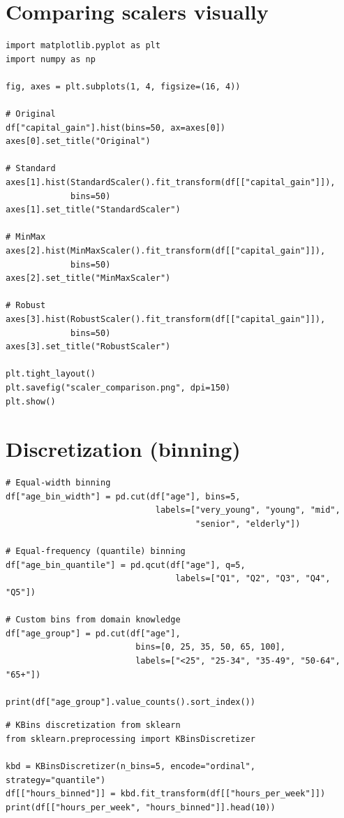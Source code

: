 \section{Comparing scalers visually}

\begin{verbatim}
import matplotlib.pyplot as plt
import numpy as np

fig, axes = plt.subplots(1, 4, figsize=(16, 4))

# Original
df["capital_gain"].hist(bins=50, ax=axes[0])
axes[0].set_title("Original")

# Standard
axes[1].hist(StandardScaler().fit_transform(df[["capital_gain"]]),
             bins=50)
axes[1].set_title("StandardScaler")

# MinMax
axes[2].hist(MinMaxScaler().fit_transform(df[["capital_gain"]]),
             bins=50)
axes[2].set_title("MinMaxScaler")

# Robust
axes[3].hist(RobustScaler().fit_transform(df[["capital_gain"]]),
             bins=50)
axes[3].set_title("RobustScaler")

plt.tight_layout()
plt.savefig("scaler_comparison.png", dpi=150)
plt.show()
\end{verbatim}

\section{Discretization (binning)}

\begin{verbatim}
# Equal-width binning
df["age_bin_width"] = pd.cut(df["age"], bins=5,
                              labels=["very_young", "young", "mid",
                                      "senior", "elderly"])

# Equal-frequency (quantile) binning
df["age_bin_quantile"] = pd.qcut(df["age"], q=5,
                                  labels=["Q1", "Q2", "Q3", "Q4", "Q5"])

# Custom bins from domain knowledge
df["age_group"] = pd.cut(df["age"],
                          bins=[0, 25, 35, 50, 65, 100],
                          labels=["<25", "25-34", "35-49", "50-64", "65+"])

print(df["age_group"].value_counts().sort_index())
\end{verbatim}

\begin{verbatim}
# KBins discretization from sklearn
from sklearn.preprocessing import KBinsDiscretizer

kbd = KBinsDiscretizer(n_bins=5, encode="ordinal", strategy="quantile")
df[["hours_binned"]] = kbd.fit_transform(df[["hours_per_week"]])
print(df[["hours_per_week", "hours_binned"]].head(10))
\end{verbatim}

